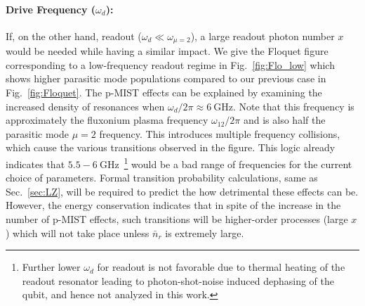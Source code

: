 \documentclass[%
reprint,
superscriptaddress,
 amsmath,amssymb,
 aps,
 prx,
longbibliography,
floatfix,
]{revtex4-2}
\begin{document}
\paragraph{Drive Frequency ($\omega_d$):} If, on the other hand, readout ($\omega_d \ll \omega_{\mu = 2}$), a large readout photon number $x$ would be needed while having a similar impact. We give the Floquet figure corresponding to a low-frequency readout regime in Fig.~\ref{fig:Flo_low} which shows higher parasitic mode populations compared to our previous case in Fig.~\ref{fig:Floquet}. The p-MIST effects can be explained by examining the increased density of resonances when $\omega_d/2\pi \approx 6 \ \mathrm{GHz}$. Note that this frequency is approximately the fluxonium plasma frequency $\omega_{12}/2\pi$ and is also half the parasitic mode $\mu=2$ frequency. This introduces multiple frequency collisions, which cause the various transitions observed in the figure. This logic already indicates that $5.5-6 \ \mathrm{GHz}$~\footnote{Further lower $\omega_d$ for readout is not favorable due to thermal heating of the readout resonator leading to photon-shot-noise induced dephasing of the qubit, and hence not analyzed in this work. } would be a bad range of frequencies for the current choice of parameters. Formal transition probability calculations, same as Sec.~\ref{sec:LZ}, will be required to predict the how detrimental these effects can be. However, the energy conservation indicates that in spite of the increase in the number of p-MIST effects, such transitions will be higher-order processes (large $x$) which will not take place unless $\bar n_r$ is extremely large.  
\end{document}
